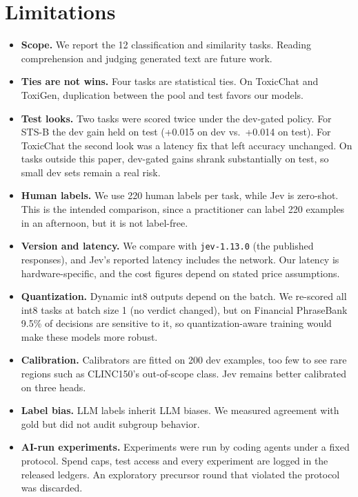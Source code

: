 \documentclass[11pt]{article}
\begin{document}
\section{Limitations}\label{sec:limitations}
\begin{itemize}
  \item \textbf{Scope.} We report the 12 classification and similarity tasks. Reading comprehension and judging generated text are future work.
  \item \textbf{Ties are not wins.} Four tasks are statistical ties. On ToxicChat and ToxiGen, duplication between the pool and test favors our models.
  \item \textbf{Test looks.} Two tasks were scored twice under the dev-gated policy. For STS-B the dev gain held on test (+0.015 on dev vs.\ +0.014 on test). For ToxicChat the second look was a latency fix that left accuracy unchanged. On tasks outside this paper, dev-gated gains shrank substantially on test, so small dev sets remain a real risk.
  \item \textbf{Human labels.} We use 220 human labels per task, while Jev is zero-shot. This is the intended comparison, since a practitioner can label 220 examples in an afternoon, but it is not label-free.
  \item \textbf{Version and latency.} We compare with \texttt{jev-1.13.0} (the published responses), and Jev's reported latency includes the network. Our latency is hardware-specific, and the cost figures depend on stated price assumptions.
  \item \textbf{Quantization.} Dynamic int8 outputs depend on the batch. We re-scored all int8 tasks at batch size 1 (no verdict changed), but on Financial PhraseBank 9.5\% of decisions are sensitive to it, so quantization-aware training would make these models more robust.
  \item \textbf{Calibration.} Calibrators are fitted on 200 dev examples, too few to see rare regions such as CLINC150's out-of-scope class. Jev remains better calibrated on three heads.
  \item \textbf{Label bias.} LLM labels inherit LLM biases. We measured agreement with gold but did not audit subgroup behavior.
  \item \textbf{AI-run experiments.} Experiments were run by coding agents under a fixed protocol. Spend caps, test access and every experiment are logged in the released ledgers. An exploratory precursor round that violated the protocol was discarded.
\end{itemize}
\end{document}
